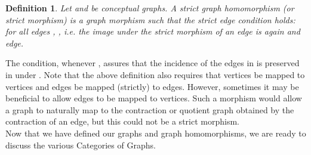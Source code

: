 \documentclass[11pt]{article}
\newtheorem{definition}[theorem]{Definition}
\begin{document}
\begin{definition}
Let  and  be conceptual graphs. A \emph{strict graph homomorphism} (or \emph{strict morphism})  is a graph morphism  such that the strict edge condition holds: for all edges , , i.e. the image under the strict morphism  of an edge is again and edge. 
\end{definition}
\indent The condition, \textunderscore whenever \textunderscore, assures that the incidence of the edges in  is preserved in  under . Note that the above definition also requires that vertices be mapped to vertices and edges be mapped (strictly) to edges. However, sometimes it may be beneficial to allow edges to be mapped to vertices. Such a morphism would allow a graph to naturally map to the contraction or quotient graph obtained by the contraction of an edge, but this could not be a strict morphism.\\
\indent Now that we have defined our graphs and graph homomorphisms, we are ready to discuss the various Categories of Graphs.
\end{document}
